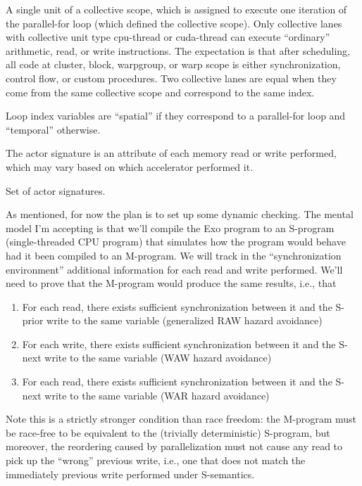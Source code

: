 \filbreak
{} A single unit of a collective scope, which is assigned to execute one iteration of the parallel-for loop (which defined the collective scope).
Only collective lanes with collective unit type cpu-thread or cuda-thread can execute ``ordinary'' arithmetic, read, or write instructions.
The expectation is that after scheduling, all code at cluster, block, warpgroup, or warp scope is either synchronization, control flow, or custom procedures.
Two collective lanes are equal when they come from the same collective scope and correspond to the same index.

\filbreak
{} Loop index variables are ``spatial'' if they correspond to a parallel-for loop and ``temporal'' otherwise.

\filbreak
{}
The actor signature is an attribute of each memory read or write performed, which may vary based on which accelerator performed it.

\filbreak
{}
Set of actor signatures.

\filbreak
{}

As mentioned, for now the plan is to set up some dynamic checking.
The mental model I'm accepting is that we'll compile the Exo program to an S-program (single-threaded CPU program) that simulates how the program would behave had it been compiled to an M-program.
We will track in the ``synchronization environment'' additional information for each read and write performed.
We'll need to prove that the M-program would produce the same results, i.e., that
\begin{enumerate}
  \item For each read, there exists sufficient synchronization between it and the S-prior write to the same variable (generalized RAW hazard avoidance)
  \item For each write, there exists sufficient synchronization between it and the S-next write to the same variable (WAW hazard avoidance)
  \item For each read, there exists sufficient synchronization between it and the S-next write to the same variable (WAR hazard avoidance)
\end{enumerate}

\filbreak
Note this is a strictly stronger condition than race freedom: the M-program must be race-free to be equivalent to the (trivially deterministic) S-program, but moreover, the reordering caused by parallelization must not cause any read to pick up the ``wrong'' previous write, i.e., one that does not match the immediately previous write performed under S-semantics.

